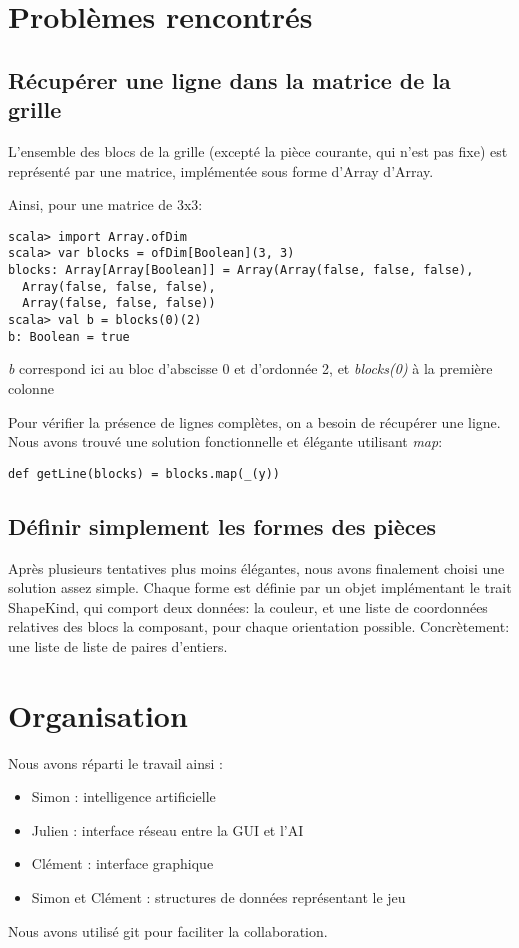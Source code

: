 \documentclass[11pt]{article}
\begin{document}
\section{Problèmes rencontrés}
\label{sec-4}

\subsection{Récupérer une ligne dans la matrice de la grille}
\label{sec-4-1}

L'ensemble des blocs de la grille (excepté la pièce courante, qui n'est pas fixe) est représenté par une matrice, implémentée sous forme d'Array d'Array.

Ainsi, pour une matrice de 3x3:

\begin{verbatim}
scala> import Array.ofDim
scala> var blocks = ofDim[Boolean](3, 3)
blocks: Array[Array[Boolean]] = Array(Array(false, false, false),
  Array(false, false, false),
  Array(false, false, false))
scala> val b = blocks(0)(2)
b: Boolean = true
\end{verbatim}

\emph{b} correspond ici au bloc d'abscisse 0 et d'ordonnée 2, et \emph{blocks(0)} à la première colonne

Pour vérifier la présence de lignes complètes, on a besoin de récupérer une ligne. Nous avons trouvé une solution fonctionnelle et élégante utilisant \emph{map}:

\begin{verbatim}
def getLine(blocks) = blocks.map(_(y))
\end{verbatim}
\subsection{Définir simplement les formes des pièces}
\label{sec-4-2}

Après plusieurs tentatives plus moins élégantes, nous avons finalement
choisi une solution assez simple. Chaque forme est définie par un
objet implémentant le trait ShapeKind, qui comport deux données: la
couleur, et une liste de coordonnées relatives des blocs la composant,
pour chaque orientation possible. Concrètement: une liste de liste de
paires d'entiers.

\section{Organisation}
\label{sec-5}

Nous avons réparti le travail ainsi :

\begin{itemize}
\item Simon : intelligence artificielle
\item Julien : interface réseau entre la GUI et l'AI
\item Clément : interface graphique
\item Simon et Clément : structures de données représentant le jeu
\end{itemize}

Nous avons utilisé git pour faciliter la collaboration.
\end{document}
